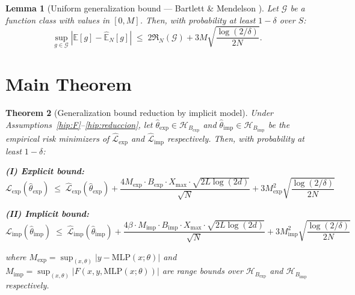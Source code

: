 \documentclass[12pt]{article}
\newtheorem{theorem}{Theorem}
\newtheorem{lemma}[theorem]{Lemma}
\newcommand{\E}{\mathbb{E}}
\newcommand{\MLP}{\mathrm{MLP}}
\newcommand{\abs}[1]{\left|#1\right|}
\newcommand{\Rad}{\mathfrak{R}}
\begin{document}
\begin{lemma}[Uniform generalization bound --- Bartlett \& Mendelson
\cite{Bartlett2002}]
\label{lema:generalizacion}
Let $\mathcal{G}$ be a function class with values in $[0, M]$.
Then, with probability at least $1 - \delta$ over $S$:
\begin{equation}
  \sup_{g \in \mathcal{G}}
  \abs{\E[g] - \hat{\E}_N[g]}
  \;\le\; 2\Rad_N(\mathcal{G})
  + 3M\sqrt{\frac{\log(2/\delta)}{2N}}.
  \label{eq:generalizacion}
\end{equation}
\end{lemma}

\section{Main Theorem}
\label{sec:main}

\begin{theorem}[Generalization bound reduction by implicit model]
\label{teo:principal}
Under Assumptions~\ref{hip:F}--\ref{hip:reduccion}, let
$\hat{\theta}_{\mathrm{exp}} \in \mathcal{H}_{B_{\mathrm{exp}}}$ and
$\hat{\theta}_{\mathrm{imp}} \in \mathcal{H}_{B_{\mathrm{imp}}}$ be
the empirical risk minimizers of
$\hat{\mathcal{L}}_{\mathrm{exp}}$ and
$\hat{\mathcal{L}}_{\mathrm{imp}}$ respectively.
Then, with probability at least $1 - \delta$:

\medskip

\textbf{(I) Explicit bound:}
\begin{equation}
  \mathcal{L}_{\mathrm{exp}}(\hat{\theta}_{\mathrm{exp}})
  \;\le\; \hat{\mathcal{L}}_{\mathrm{exp}}(\hat{\theta}_{\mathrm{exp}})
  + \frac{4 M_{\mathrm{exp}} \cdot B_{\mathrm{exp}} \cdot X_{\max}
    \cdot \sqrt{2L\log(2d)}}{\sqrt{N}}
  + 3 M_{\mathrm{exp}}^2
    \sqrt{\frac{\log(2/\delta)}{2N}}
  \label{eq:cota_exp}
\end{equation}

\textbf{(II) Implicit bound:}
\begin{equation}
  \mathcal{L}_{\mathrm{imp}}(\hat{\theta}_{\mathrm{imp}})
  \;\le\; \hat{\mathcal{L}}_{\mathrm{imp}}(\hat{\theta}_{\mathrm{imp}})
  + \frac{4 \beta \cdot M_{\mathrm{imp}} \cdot B_{\mathrm{imp}}
    \cdot X_{\max} \cdot \sqrt{2L\log(2d)}}{\sqrt{N}}
  + 3 M_{\mathrm{imp}}^2
    \sqrt{\frac{\log(2/\delta)}{2N}}
  \label{eq:cota_imp}
\end{equation}

\noindent where
$M_{\mathrm{exp}} = \sup_{(x,\theta)} |y - \MLP(x;\theta)|$ and
$M_{\mathrm{imp}} = \sup_{(x,\theta)} |F(x,y,\MLP(x;\theta))|$ are
range bounds over $\mathcal{H}_{B_{\mathrm{exp}}}$ and
$\mathcal{H}_{B_{\mathrm{imp}}}$ respectively.
\end{theorem}
\end{document}
